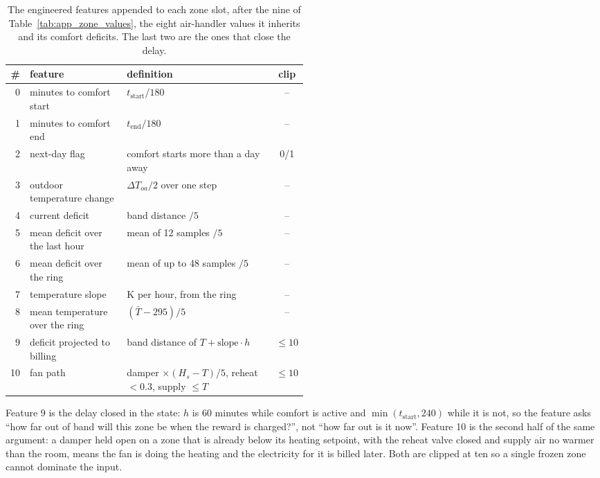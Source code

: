 \documentclass{article}
\begin{document}
\begin{table}[h!]
\centering
\footnotesize
\setlength{\tabcolsep}{4pt}
\begin{tabular}{@{}rlp{0.5\linewidth}c@{}}
\toprule
\# & feature & definition & clip \\
\midrule
0 & minutes to comfort start & $t_{\text{start}}/180$ & -- \\
1 & minutes to comfort end & $t_{\text{end}}/180$ & -- \\
2 & next-day flag & comfort starts more than a day away & 0/1 \\
3 & outdoor temperature change & $\Delta T_{oa}/2$ over one step & -- \\
4 & current deficit & band distance $/5$ & -- \\
5 & mean deficit over the last hour & mean of 12 samples $/5$ & -- \\
6 & mean deficit over the ring & mean of up to 48 samples $/5$ & -- \\
7 & temperature slope & K per hour, from the ring & -- \\
8 & mean temperature over the ring & $(\bar T-295)/5$ & -- \\
9 & deficit projected to billing & band distance of $T+\text{slope}\cdot h$ & $\le 10$ \\
10 & fan path & damper $\times(H_s-T)/5$, reheat $<0.3$, supply $\le T$ & $\le 10$ \\
\bottomrule
\end{tabular}
\vspace{4pt}
\caption{The engineered features appended to each zone slot, after the nine of Table~\ref{tab:app_zone_values}, the eight air-handler values it inherits and its comfort deficits. The last two are the ones that close the delay.}
\label{tab:app_features}
\end{table}

Feature 9 is the delay closed in the state: $h$ is 60 minutes while comfort is active and $\min(t_{\text{start}},240)$ while it is not, so the feature asks ``how far out of band will this zone be when the reward is charged?'', not ``how far out is it now''. Feature 10 is the second half of the same argument: a damper held open on a zone that is already below its heating setpoint, with the reheat valve closed and supply air no warmer than the room, means the fan is doing the heating and the electricity for it is billed later. Both are clipped at ten so a single frozen zone cannot dominate the input.
\end{document}
